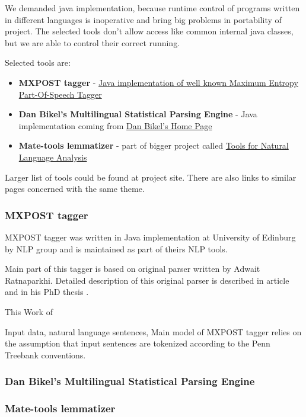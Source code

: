 We demanded java implementation, because runtime control of programs written in different languages is inoperative and bring big problems in portability of project. The selected tools don't allow access like common internal java classes, but we are able to control their correct running.

Selected tools are:
 
\begin{itemize}
\item {\bf MXPOST tagger} - \href{http://www.inf.ed.ac.uk/resources/nlp/local_doc/MXPOST.html}{Java implementation of well known Maximum Entropy Part-Of-Speech Tagger}
\item {\bf Dan Bikel's Multilingual Statistical Parsing Engine } - Java implementation coming from \href{http://www.cis.upenn.edu/~dbikel/software.html#stat-parser}{Dan Bikel’s Home Page}
\item {\bf Mate-tools lemmatizer} - part of bigger project called \href{http://code.google.com/p/mate-tools/}{Tools for Natural Language Analysis}
\end{itemize}

Larger list of tools could be found at project site. There are also links to similar pages concerned with the same theme. 
          
\subsubsection{MXPOST tagger} 
MXPOST tagger was written in Java implementation at University of Edinburg by NLP group and is maintained as part of theirs NLP tools.
        
Main part of this tagger is based on original parser written by Adwait Ratnaparkhi. Detailed description of this original parser is described in article \cite{Linguistics-ratnaparkhi96} and in his PhD thesis \cite{Linguistics-ratnaparkhi98}. 

This 
Work of 

Input data, natural language sentences, 
Main model of MXPOST tagger relies on the assumption that input sentences are tokenized
according to the Penn Treebank conventions.
  
\subsubsection{Dan Bikel's Multilingual Statistical Parsing Engine}   

\subsubsection{Mate-tools lemmatizer}          
          
